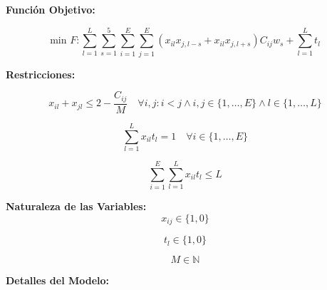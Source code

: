\documentclass[letter, 10pt]{article}
\begin{document}
\textbf{Función Objetivo:}

\begin{equation} \label{eq:1}
	\text{min } F: \sum_{l=1}^{L} \sum_{s=1}^{5} \sum_{i=1}^{E} \sum_{j=1}^{E} (x_{il}x_{j,l-s} + x_{il}x_{j,l+s}) C_{ij} w_{s} + \sum_{l=1}^{L} t_{l}
\end{equation}

\textbf{Restricciones:}

\begin{equation} \label{eq:2}
	x_{il} + x_{jl} \leq 2 - \frac{C_{ij}}{M} \quad \forall i, j : i<j \wedge i, j \in \{1, \ldots, E\} \wedge l \in \{1, \ldots, L\}
\end{equation}

\begin{equation} \label{eq:3}
	\sum_{l=1}^{L} x_{il}t_l = 1 \quad \forall i \in \{1, \ldots, E\}
\end{equation}

\begin{equation} \label{eq:4}
	\sum_{i=1}^{E} \sum_{l=1}^{L} x_{il}t_l \leq L
\end{equation}

\textbf{Naturaleza de las Variables:}
\begin{equation*}
	x_{ij} \in \{1, 0\}
\end{equation*}

\begin{equation*}
	t_{l} \in \{1, 0\}
\end{equation*}

\begin{equation*}
	M \in \mathbb N
\end{equation*}

\textbf{Detalles del Modelo:}
\end{document}
